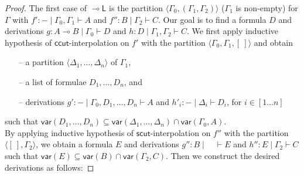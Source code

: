 \documentclass[sn-mathphys-num]{sn-jnl}%
\newcommand{\GG}{\Gamma}
\newcommand{\GD}{\Delta}
\newcommand{\lolli}{\multimap}
\newcommand{\lleft}{{\lolli}\mathsf{L}}
\newcommand{\lright}{{\lolli}\mathsf{R}}
\newcommand{\vdG}{\vdash}
\newcommand{\mf}[1]{\mathsf{#1}}
\newcommand{\vars}[1]{\mathsf{var}(#1)}
\theoremstyle{thmstyleone}%
\theoremstyle{thmstyletwo}%
\theoremstyle{thmstylethree}%
\begin{document}
\begin{proof}
The first case of $\lleft$ is the partition $\langle \GG_0, (\GG_1, \GG_2) \rangle$ ($\GG_1$ is non-empty) for $\GG$ with $f' : {-} \mid \GG_0, \GG_1 \vdG A$ and $f'': B \mid \GG_2 \vdG C$.
Our goal is to find a formula $D$ and derivations $g : A\lolli B \mid \GG_0 \vdG D$ and $h: D \mid \GG_1, \GG_2 \vdG C$.
We first apply inductive hypothesis of $\mf{ccut}$-interpolation on $f'$ with the partition $\langle \GG_0 , \GG_1 , [\ ]\rangle$ and obtain 
\begin{itemize}
  \item[--] a partition $\langle \GD_1, \dots , \GD_n \rangle$ of $\GG_1$,
  \item[--] a list of formulae $D_1 , \dots , D_n$, and 
  \item[--] derivations $g': {-} \mid \GG_0 , D_1, \dots, D_n \vdG A$ and $h'_i : {-} \mid \GD_i \vdG D_i$, for $i \in [1\dots n]$
\end{itemize}
such that $\vars{D_1 , \dots , D_n} \subseteq \vars{\GD_1 , \dots , \GD_n} \cap \vars{\GG_0 , A}$.
\\
By applying inductive hypothesis of $\mf{scut}$-interpolation on $f''$ with the partition $\langle [\ ] , \GG_2 \rangle$, we obtain a formula $E$ and derivations $g'' : B \mid \quad \vdG E$ and $h'': E \mid \GG_2 \vdG C$ such that $\vars{E} \subseteq \vars{B} \cap \vars{\GG_2 , C}$.
Then we construct the desired derivations as follows:

\end{proof}
\end{document}
